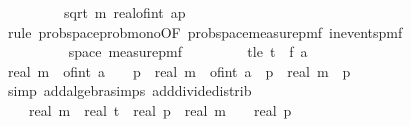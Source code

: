 \begin{isabellebody}
\ \ \ \ \ \ {\isasymge}\ {}\ {\isacharasterisk}{\kern0pt}\ sqrt\ {\isacharparenleft}{\kern0pt}m\ {\isacharasterisk}{\kern0pt}{\isacharparenleft}{\kern0pt}real{\isacharunderscore}{\kern0pt}of{\isacharunderscore}{\kern0pt}int\ a{\isacharplus}{\kern0pt}{}{\isacharparenright}{\kern0pt}{\isacharslash}{\kern0pt}p{\isacharparenright}{\kern0pt}{\isacharparenright}{\kern0pt}{\isachardoublequoteclose}\isanewline
\ \ \ \ \isamarkupfalse%
\ {\isacharparenleft}{\kern0pt}rule\ prob{\isacharunderscore}{\kern0pt}space{\isachardot}{\kern0pt}prob{\isacharunderscore}{\kern0pt}mono{\isacharbrackleft}{\kern0pt}OF\ prob{\isacharunderscore}{\kern0pt}space{\isacharunderscore}{\kern0pt}measure{\isacharunderscore}{\kern0pt}pmf\ in{\isacharunderscore}{\kern0pt}events{\isacharunderscore}{\kern0pt}pmf{\isacharbrackright}{\kern0pt}{\isacharparenright}{\kern0pt}\isanewline
\ \ \ \ \ \ \isamarkupfalse%
\ {\isasymomega}\isanewline
\ \ \ \ \ \ \isamarkupfalse%
\ {\isachardoublequoteopen}{\isasymomega}\ {\isasymin}\ space\ {\isacharparenleft}{\kern0pt}measure{\isacharunderscore}{\kern0pt}pmf\ {\isasymOmega}\isanewline
\ \ \ \ \ \ \isamarkupfalse%
\ t{\isacharunderscore}{\kern0pt}le{\isacharcolon}{\kern0pt}\ {\isachardoublequoteopen}t\ {\isasymle}\ f\ a\ {\isasymomega}{\isachardoublequoteclose}\isanewline
\ \ \ \ \ \ \isamarkupfalse%
\ {\isachardoublequoteopen}real\ m\ {\isacharasterisk}{\kern0pt}\ {\isacharparenleft}{\kern0pt}of{\isacharunderscore}{\kern0pt}int\ a\ {\isacharplus}{\kern0pt}\ {}{\isacharparenright}{\kern0pt}\ {\isacharslash}{\kern0pt}\ p\ {\isacharequal}{\kern0pt}\ real\ m\ {\isacharasterisk}{\kern0pt}\ {\isacharparenleft}{\kern0pt}of{\isacharunderscore}{\kern0pt}int\ a{\isacharparenright}{\kern0pt}\ {\isacharslash}{\kern0pt}\ p\ {\isacharplus}{\kern0pt}\ real\ m\ {\isacharslash}{\kern0pt}\ p{\isachardoublequoteclose}\isanewline
\ \ \ \ \ \ \ \ \isamarkupfalse%
\ {\isacharparenleft}{\kern0pt}simp\ add{\isacharcolon}{\kern0pt}algebra{\isacharunderscore}{\kern0pt}simps\ add{\isacharunderscore}{\kern0pt}divide{\isacharunderscore}{\kern0pt}distrib{\isacharparenright}{\kern0pt}\isanewline
\ \ \ \ \ \ \isamarkupfalse%
\ \isamarkupfalse%
\ {\isachardoublequoteopen}{\isachardot}{\kern0pt}{\isachardot}{\kern0pt}{\isachardot}{\kern0pt}\ {\isasymle}\ \ real\ m\ {\isacharasterisk}{\kern0pt}\ {\isacharparenleft}{\kern0pt}real\ t\ {\isacharasterisk}{\kern0pt}\ real\ p\ {\isacharslash}{\kern0pt}\ {\isacharparenleft}{\kern0pt}real\ m\ {\isacharasterisk}{\kern0pt}\ {\isacharparenleft}{\kern0pt}{}{\isacharplus}{\kern0pt}{\isasymdelta}{\isacharprime}{\kern0pt}{\isacharparenright}{\kern0pt}{\isacharparenright}{\kern0pt}{\isacharparenright}{\kern0pt}\ {\isacharslash}{\kern0pt}\ real\ p\ {\isacharplus}{\kern0pt}\ {}{\isachardoublequoteclose}\isanewline

\end{isabellebody}
